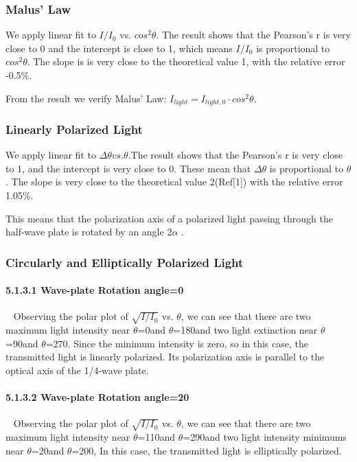 \documentclass[12pt,a4paper]{article}
\begin{document}
\subsubsection{Malus’ Law} 
We apply linear fit to $I/I_0$ vs. $cos^2\theta$. The result shows that the Pearson’s r is very close to 0 and the intercept is close to 1, which means $I/I_0$ is proportional to $cos^2\theta$. The slope is is very close to the theoretical value 1, with the relative error -0.5\%.\par 
From the result we verify Malus’ Law: $I _{light}=I _{light,0}\cdot cos^2 \theta$.
\subsubsection{Linearly Polarized Light}
We apply linear fit to $\Delta\theta vs. \theta$.The result shows that the Pearson’s r is very close to 1, and the intercept is very close to 0. These mean that $\Delta\theta$ is proportional to $\theta$. The slope is very close to the theoretical value 2(Ref[1]) with the relative error 1.05\%.\par 
This means that the polarization axis of a polarized light passing through the half-wave plate is rotated by an angle $2\alpha$ .


\subsubsection{Circularly and Elliptically Polarized Light}
\paragraph{5.1.3.1 Wave-plate Rotation angle=0\degree}~{} \newline
Observing the polar plot of $\sqrt{I/I_0}$ vs. $\theta$, we can see that there are two maximum light intensity near $\theta$=0\degree and $\theta$=180\degree and two light extinction near $\theta$=90\degree and $\theta$=270\degree. Since the minimum intensity is zero, so in this case, the transmitted light is linearly polarized. Its polarization axis is parallel to the optical axis of the 1/4-wave plate.
\paragraph{5.1.3.2 Wave-plate Rotation angle=20\degree}~{} \newline
Observing the polar plot of $\sqrt{I/I_0}$ vs. $\theta$, we can see that there are two maximum light intensity near $\theta$=110\degree and $\theta$=290\degree and two light intensity minimums near $\theta$=20\degree and $\theta$=200\degree, In this case, the transmitted light is elliptically polarized.
\end{document}
